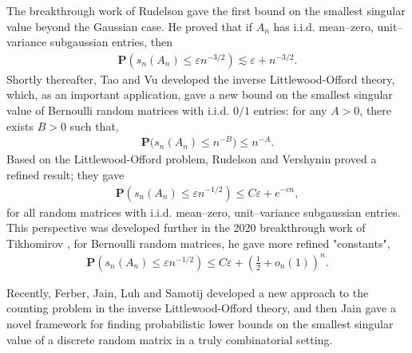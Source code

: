 \documentclass{article}
\numberwithin{equation}{section}
\theoremstyle{plain}
\begin{document}
The breakthrough work of Rudelson \cite{MR2434885} gave the first bound on the smallest singular value beyond the Gaussian case. He proved that if $A_n$ has i.i.d. mean–zero, unit–variance subgaussian entries, then
\begin{align*}
\textbf{P}\left(s_n\left(A_n\right) \leq \varepsilon n^{-3 / 2}\right) \lesssim \varepsilon+n^{-3 / 2}.
\end{align*}
Shortly thereafter, Tao and Vu \cite{MR2480613} developed the inverse Littlewood-Offord theory, which, as an important application, gave a new bound on the
smallest singular value of Bernoulli random matrices with i.i.d. $0/1$ entries: for any $A>0$, there exists $B>0$ such that,  
\begin{align*}
\textbf{P}\bigl(s_n(A_n)\le n^{-B}\bigr)\le n^{-A}.
\end{align*}
Based on the Littlewood-Offord problem, Rudelson and Vershynin \cite{MR2407948} proved a refined result; they gave
\begin{align*}
\textbf{P}\left(s_n\left(A_n\right) \leq \varepsilon n^{-1 / 2}\right) \leq C \varepsilon+e^{-c n},
\end{align*}
 for all random matrices with i.i.d. mean–zero, unit–variance subgaussian entries. This perspective was developed further in the 2020 breakthrough work of Tikhomirov \cite{MR4076632}, for Bernoulli random matrices, he gave more refined "constants",
\begin{align*}
\textbf{P}\left(s_n\left(A_n\right) \leq \varepsilon n^{-1 / 2}\right) \leq C \varepsilon+\left(\frac{1}{2}+o_n(1)\right)^n.
\end{align*}

\par
Recently, Ferber, Jain, Luh and Samotij \cite{MR4273471} developed a new approach to the counting problem in the inverse Littlewood-Offord theory, and then Jain \cite{MR4282089} gave a novel framework for finding probabilistic lower bounds on the smallest singular value of a discrete random matrix in a truly combinatorial setting. 
\end{document}
